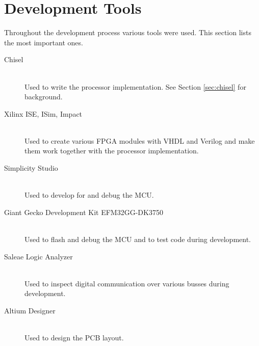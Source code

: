 \section{Development Tools}
Throughout the development process various tools were used.
This section lists the most important ones.

\begin{description}
    \item[Chisel]
    \hfill\\
    Used to write the processor implementation.
    See Section \ref{sec:chisel} for background.
    \item[Xilinx ISE, ISim, Impact]
    \hfill\\
    Used to create various FPGA modules with VHDL and Verilog and make them work together with the processor implementation.
    \item[Simplicity Studio]
    \hfill\\
    Used to develop for and debug the MCU.
    \item[Giant Gecko Development Kit EFM32GG-DK3750]
    \hfill\\
    Used to flash and debug the MCU and to test code during development.
    \item[Saleae Logic Analyzer]
    \hfill\\
    Used to inspect digital communication over various busses during development.
    \item[Altium Designer]
    \hfill\\
    Used to design the PCB layout.
\end{description}

